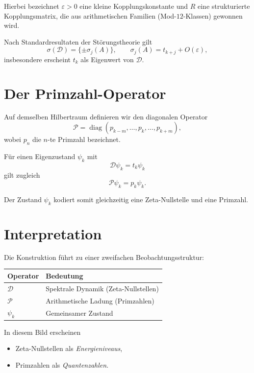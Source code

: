 \documentclass[11pt,a4paper]{article}
\begin{document}
Hierbei bezeichnet $\varepsilon>0$ eine kleine Kopplungskonstante und
$R$ eine strukturierte Kopplungsmatrix, die aus arithmetischen
Familien (Mod-$12$-Klassen) gewonnen wird.

Nach Standardresultaten der Störungstheorie gilt
\[
\sigma(\mathcal D)=\{\pm\sigma_j(A)\}, \qquad
\sigma_j(A)=t_{k+j}+O(\varepsilon),
\]
insbesondere erscheint $t_k$ als Eigenwert von $\mathcal D$.

\section{Der Primzahl-Operator}

Auf demselben Hilbertraum definieren wir den diagonalen Operator
\[
\mathcal P=\operatorname{diag}(p_{k-m},\dots,p_k,\dots,p_{k+m}),
\]
wobei $p_n$ die $n$-te Primzahl bezeichnet.

Für einen Eigenzustand $\psi_k$ mit
\[
\mathcal D\psi_k=t_k\psi_k
\]
gilt zugleich
\[
\mathcal P\psi_k=p_k\psi_k.
\]

Der Zustand $\psi_k$ kodiert somit gleichzeitig eine
Zeta-Nullstelle und eine Primzahl.

\section{Interpretation}

Die Konstruktion führt zu einer zweifachen Beobachtungsstruktur:

\begin{center}
\begin{tabular}{ll}
\toprule
Operator & Bedeutung\\
\midrule
$\mathcal D$ & Spektrale Dynamik (Zeta-Nullstellen)\\
$\mathcal P$ & Arithmetische Ladung (Primzahlen)\\
$\psi_k$     & Gemeinsamer Zustand\\
\bottomrule
\end{tabular}
\end{center}

In diesem Bild erscheinen
\begin{itemize}
  \item Zeta-Nullstellen als \emph{Energieniveaus},
  \item Primzahlen als \emph{Quantenzahlen}.
\end{itemize}
\end{document}
